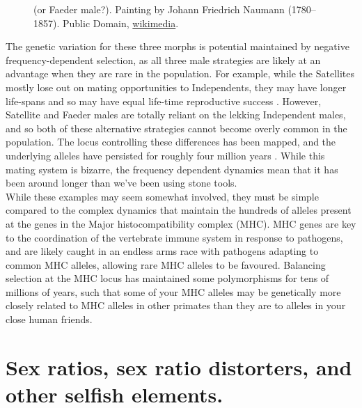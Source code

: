{\begin{figure}
{(or Faeder male?). {\newline \noindent  \tiny{ Painting by Johann
    Friedrich Naumann (1780–1857). Public Domain,
    \href{https://en.wikipedia.org/wiki/Ruff\#/media/File:Philomachus_pugnax_naumann.jpg}{wikimedia}.}}}\label{fig:Ruff}  
\end{figure}
The genetic variation for these three morphs is potential maintained by
negative frequency-dependent selection, as all three male strategies
are likely at an advantage when they are rare in the population. For
example, while the Satellites mostly lose out on mating opportunities
to Independents, they may have longer life-spans and so may have equal
life-time reproductive success \citep{widemo1998alternative}. However, Satellite and Faeder males
are totally reliant on the lekking Independent males, and so both of
these alternative strategies cannot become overly common in the
population. The locus controlling these differences has been mapped,
and the underlying alleles have persisted for roughly four million years
\citep{kupper2016supergene,lamichhaney2016structural}. While this mating system is
bizarre, the frequency dependent dynamics mean that it has been around
longer than we've been using stone tools. \\ 

While these examples may seem somewhat involved, they must be simple
compared to the complex dynamics that maintain the hundreds of alleles
present at the genes in the Major histocompatibility complex (MHC). MHC
genes are key to the coordination of the vertebrate immune
system in response to pathogens, and are likely caught in an endless arms
race with pathogens adapting to common MHC alleles, allowing rare MHC
alleles to be favoured. Balancing selection at the MHC locus has maintained
some polymorphisms for tens of millions of years, such that some of
your MHC alleles may be genetically more closely related to MHC alleles in other primates than they are to alleles in your
close human friends. 


\section{Sex ratios, sex ratio distorters, and other selfish
  elements. }

}

